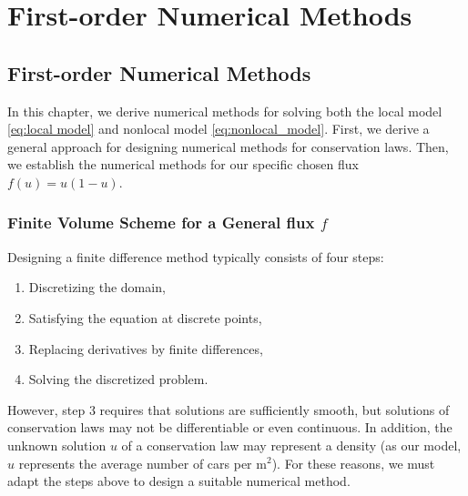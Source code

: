 \part{First-order Numerical Methods}
\chapter{First-order Numerical Methods}\label{chap:chapter_3}
In this chapter, we derive numerical methods for solving both the local model \eqref{eq:local model} and nonlocal model \eqref{eq:nonlocal_model}. First, we derive a general approach for designing numerical methods for conservation laws. Then, we establish the numerical methods for our specific chosen flux $f(u) =u(1-u)$.
\section{Finite Volume Scheme for a General flux \texorpdfstring{$f$}{f}}
Designing a finite difference method typically consists of four steps:
\begin{enumerate}
    \item Discretizing the domain,
    \item Satisfying the equation at discrete points,
    \item Replacing derivatives by finite differences,
    \item Solving the discretized problem.
\end{enumerate}

However, step 3 requires that solutions are sufficiently smooth, but solutions of conservation laws may not be differentiable or even continuous. In addition, the unknown solution $u$ of a conservation law may represent a density (as our model, $u$ represents the average number of cars per $\mathrm{m}^2$). For these reasons, we must adapt the steps above to design a suitable numerical method.


